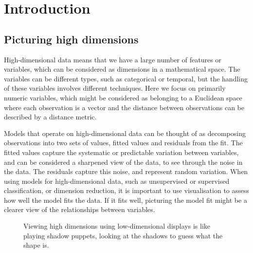 \documentclass[
  letterpaper,
]{krantz}
\begin{document}
\part{Introduction}

\chapter{Picturing high dimensions}\label{intro}

High-dimensional data means that we have a large number of features or
variables, which can be considered as dimensions in a mathematical
space. The variables can be different types, such as categorical or
temporal, but the handling of these variables involves different
techniques. Here we focus on primarily numeric variables, which might be
considered as belonging to a Euclidean space where each observation is a
vector and the distance between observations can be described by a
distance metric.  
  

Models that operate on high-dimensional data can be thought of as
decomposing observations into two sets of values, fitted values and
residuals from the fit. The fitted values capture the systematic or
predictable variation between variables, and can be considered a
sharpened view of the data, to see through the noise in the data. The
residuals capture this noise, and represent random variation. When using
models for high-dimensional data, such as unsupervised or supervised
classification, or dimension reduction, it is important to use
visualisation to assess how well the model fits the data. If it fits
well, picturing the model fit might be a clearer view of the
relationships between variables. 

\begin{figure}


\caption{\label{fig-shadow-puppets}Viewing high dimensions using
low-dimensional displays is like playing shadow puppets, looking at the
shadows to guess what the shape is.}

\end{figure}%
\end{document}
